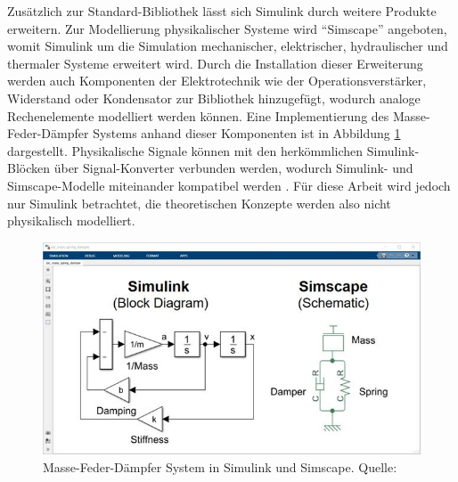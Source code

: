 Zusätzlich zur Standard-Bibliothek lässt sich Simulink durch weitere Produkte erweitern. Zur Modellierung physikalischer Systeme wird \zb "`Simscape"' angeboten, womit Simulink um die Simulation mechanischer, elektrischer, hydraulischer und thermaler Systeme erweitert wird. Durch die Installation dieser Erweiterung werden auch Komponenten der Elektrotechnik wie der Operationsverstärker, Widerstand oder Kondensator zur Bibliothek hinzugefügt, wodurch analoge Rechenelemente modelliert werden können. Eine Implementierung des Masse-Feder-Dämpfer Systems anhand dieser Komponenten ist in Abbildung \ref{fig:Simulink und Simscape} dargestellt. Physikalische Signale können mit den herkömmlichen Simulink-Blöcken über Signal-Konverter verbunden werden, wodurch Simulink- und Simscape-Modelle miteinander kompatibel werden \cite{MathWorksSimscape}. Für diese Arbeit wird jedoch nur Simulink betrachtet, die theoretischen Konzepte werden also nicht physikalisch modelliert.

\begin{figure}[h]
  \includegraphics[width=\textwidth]{abbildungen/simulink_simscape.jpg}
  \caption{Masse-Feder-Dämpfer System in Simulink und Simscape. Quelle: \cite{MathWorksSimscape}}
  \label{fig:Simulink und Simscape}
\end{figure}
